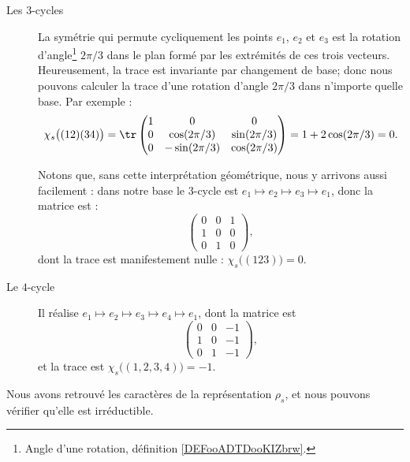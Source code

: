 \begin{description}
	\item[Les \( 3\)-cycles]
	      La symétrie qui permute cycliquement les points \( e_1\), \( e_2\) et \( e_3\) est la rotation d'angle\footnote{Angle d'une rotation, définition \ref{DEFooADTDooKIZbrw}.} \( 2\pi/3\) dans le plan formé par les extrémités de ces trois vecteurs. Heureusement, la trace est invariante par changement de base; donc nous pouvons calculer la trace d'une rotation d'angle \( 2\pi/3\) dans n'importe quelle base. Par exemple :
	      \begin{equation}
		      \chi_s\big( (12)(34) \big)=\tr\begin{pmatrix}
			      1 & 0             & 0            \\
			      0 & \cos(2\pi/3)  & \sin(2\pi/3) \\
			      0 & -\sin(2\pi/3) & \cos(2\pi/3)
		      \end{pmatrix}=1+2\cos(2\pi/3)=0.
	      \end{equation}

	      Notons que, sans cette interprétation géométrique, nous y arrivons aussi facilement : dans notre base le \( 3\)-cycle est \( e_1\mapsto e_2\mapsto e_3\mapsto e_1\), donc la matrice est :
	      \begin{equation}
		      \begin{pmatrix}
			      0 & 0 & 1 \\
			      1 & 0 & 0 \\
			      0 & 1 & 0
		      \end{pmatrix},
	      \end{equation}
	      dont la trace est manifestement nulle : \( \chi_s\big( (123) \big)=0\).

	\item[Le \( 4\)-cycle]

	      Il réalise \( e_1\mapsto e_2\mapsto e_3\mapsto e_4\mapsto e_1\), dont la matrice est
	      \begin{equation}        \label{EQooONDUooYlduup}
		      \begin{pmatrix}
			      0 & 0 & -1 \\
			      1 & 0 & -1 \\
			      0 & 1 & -1
		      \end{pmatrix},
	      \end{equation}
	      et la trace est \( \chi_s\big( (1,2,3,4) \big)=-1\).
\end{description}
Nous avons retrouvé les caractères de la représentation \( \rho_s\), et nous pouvons vérifier qu'elle est irréductible.
